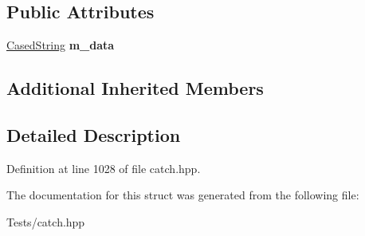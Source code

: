 \subsection*{Public Attributes}
\begin{DoxyCompactItemize}
\item 
\mbox{\label{struct_catch_1_1_matchers_1_1_impl_1_1_std_string_1_1_equals_ae09964b7ba291ce574b514a2ee3eddb0}} 
\hyperlink{struct_catch_1_1_matchers_1_1_impl_1_1_std_string_1_1_cased_string}{Cased\+String} {\bfseries m\+\_\+data}
\end{DoxyCompactItemize}
\subsection*{Additional Inherited Members}


\subsection{Detailed Description}


Definition at line 1028 of file catch.\+hpp.



The documentation for this struct was generated from the following file\+:\begin{DoxyCompactItemize}
\item 
Tests/catch.\+hpp\end{DoxyCompactItemize}
